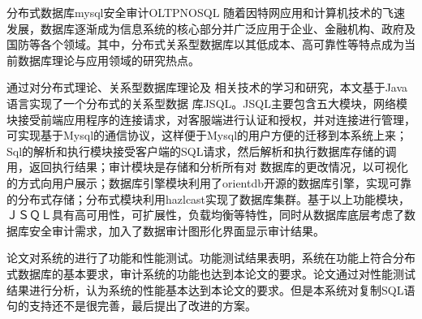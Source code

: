 
\begin{Cabstract}{分布式数据库}{mysql}{安全审计}{OLTP}{NOSQL}
随着因特网应用和计算机技术的飞速发展，数据库逐渐成为信息系统的核心部分并广泛应用于企业、金融机构、政府及国防等各个领域。其中，分布式关系型数据库以其低成本、高可靠性等特点成为当前数据库理论与应用领域的研究热点。

通过对分布式理论、关系型数据库理论及 相关技术的学习和研究，本文基于Java语言实现了一个分布式的关系型数据 库JSQL。JSQL主要包含五大模块，网络模块接受前端应用程序的连接请求，对客服端进行认证和授权，并对连接进行管理，可实现基于Mysql的通信协议，这样便于Mysql的用户方便的迁移到本系统上来；Sql的解析和执行模块接受客户端的SQL请求，然后解析和执行数据库存储的调用，返回执行结果；审计模块是存储和分析所有对 数据库的更改情况，以可视化的方式向用户展示；数据库引擎模块利用了orientdb开源的数据库引擎，实现可靠的分布式存储；分布式模块利用hazlcast实现了数据库集群。基于以上功能模块，ＪＳＱＬ具有高可用性，可扩展性，负载均衡等特性，同时从数据库底层考虑了数据库安全审计需求，加入了数据审计图形化界面显示审计结果。

论文对系统的进行了功能和性能测试。功能测试结果表明，系统在功能上符合分布式数据库的基本要求，审计系统的功能也达到本论文的要求。论文通过对性能测试结果进行分析，认为系统的性能基本达到本论文的要求。但是本系统对复制SQL语句的支持还不是很完善，最后提出了改进的方案。
\end{Cabstract}